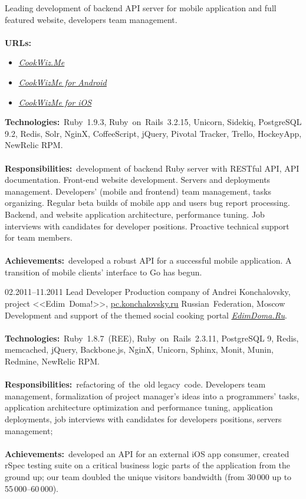 \documentclass[12pt,a4paper,final]{moderncv}
\begin{document}
{
  Leading development of backend API server for mobile application and full featured website, developers team management.
  \\\\
  \textbf{URLs:}
  \begin{itemize}
    \item \underline{\href{https://cookwiz.me/}{\itshape CookWiz.Me}}
    \item \underline{\href{https://play.google.com/store/apps/details?id=com.cookwizme}{\itshape CookWizMe for Android}}
    \item \underline{\href{https://itunes.apple.com/app/id605764643}{\itshape CookWizMe for iOS}}
  \end{itemize}
  \bigskip
  \textbf{Technologies:}~Ruby~1.9.3, Ruby~on~Rails~3.2.15, Unicorn, Sidekiq, PostgreSQL 9.2, Redis, Solr, NginX, CoffeeScript, jQuery, Pivotal Tracker, Trello, HockeyApp, NewRelic RPM.
  \\\\
  \textbf{Responsibilities:}~development of backend Ruby server with RESTful API, API documentation. Front-end website development. Servers and deployments management. Developers' (mobile and frontend) team management, tasks organizing. Regular beta builds of mobile app and users bug report processing. Backend, and website application architecture, performance tuning. Job interviews with candidates for developer positions. Proactive technical support for team members.
  \\\\
  \textbf{Achievements:}~developed a robust API for a successful mobile application. A transition of mobile clients' interface to Go has begun.
}
%
\cventry
{02.2011--11.2011}
{Lead Developer}
{
  Production company of Andrei Konchalovsky, project <<Edim~Doma!>>, \underline{\href{http://pc.konchalovsky.ru}{pc.konchalovsky.ru}}
}
{Russian~Federation, Moscow}
{}
{
  Development and support of the themed social cooking portal \underline{\href{http://www.edimdoma.ru}{\itshape EdimDoma.Ru}}.
  \\\\
  \textbf{Technologies:}~Ruby~1.8.7~(REE), Ruby~on~Rails~2.3.11, PostgreSQL 9, Redis, memcached, jQuery, Backbone.js, NginX, Unicorn, Sphinx, Monit, Munin, Redmine, NewRelic RPM.
  \\\\
  \textbf{Responsibilities:}~refactoring of~the~old legacy~code. Developers team management, formalization of project manager's ideas into a programmers' tasks, application architecture optimization and performance tuning, application deployments, job interviews with candidates for developers positions, servers management;
  \\\\
  \textbf{Achievements:}~developed an API for an external iOS app consumer, created rSpec testing suite on a critical business logic parts of the application from the ground up; our team doubled the unique visitors bandwidth (from 30\,000 up to 55\,000--60\,000).
}
\end{document}
